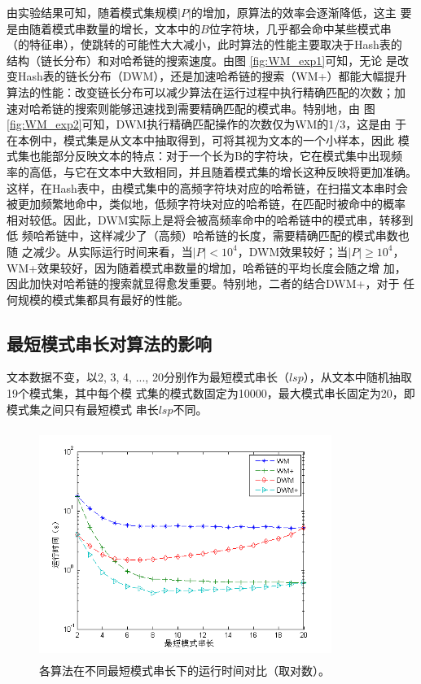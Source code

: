 由实验结果可知，随着模式集规模$|P|$的增加，原算法的效率会逐渐降低，这主
要是由随着模式串数量的增长，文本中的$B$位字符块，几乎都会命中某些模式串
（的特征串），使跳转的可能性大大减小，此时算法的性能主要取决于Hash表的
结构（链长分布）和对哈希链的搜索速度。由图 \ref{fig:WM_exp1}可知，无论
是改变Hash表的链长分布（DWM），还是加速哈希链的搜索（WM+）都能大幅提升
算法的性能：改变链长分布可以减少算法在运行过程中执行精确匹配的次数；加
速对哈希链的搜索则能够迅速找到需要精确匹配的模式串。特别地，由
图 \ref{fig:WM_exp2}可知，DWM执行精确匹配操作的次数仅为WM的1/3，这是由
于在本例中，模式集是从文本中抽取得到，可将其视为文本的一个小样本，因此
模式集也能部分反映文本的特点：对于一个长为B的字符块，它在模式集中出现频
率的高低，与它在文本中大致相同，并且随着模式集的增长这种反映将更加准确。
这样，在Hash表中，由模式集中的高频字符块对应的哈希链，在扫描文本串时会
被更加频繁地命中，类似地，低频字符块对应的哈希链，在匹配时被命中的概率
相对较低。因此，DWM实际上是将会被高频率命中的哈希链中的模式串，转移到低
频哈希链中，这样减少了（高频）哈希链的长度，需要精确匹配的模式串数也随
之减少。从实际运行时间来看，当$|P|<10^4$，DWM效果较好；当$|P| \geq
10^4$，WM+效果较好，因为随着模式串数量的增加，哈希链的平均长度会随之增
加，因此加快对哈希链的搜索就显得愈发重要。特别地，二者的结合DWM+，对于
任何规模的模式集都具有最好的性能。

\subsection{最短模式串长对算法的影响}
\label{sec:5_exp_2}

文本数据不变，以2, 3, 4, ...,
20分别作为最短模式串长（$lsp$），从文本中随机抽取19个模式集，其中每个模
式集的模式数固定为10000，最大模式串长固定为20，即模式集之间只有最短模式
串长$lsp$不同。

\begin{figure}[H]
  \centering
  \includegraphics[height=7.5cm ,width=9.5cm]{figures/5_WM/WM_exp3.png}
  \caption{各算法在不同最短模式串长下的运行时间对比（取对数）。}
  \label{fig:WM_exp3}
\end{figure}

